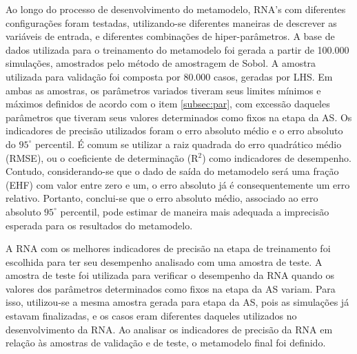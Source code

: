\documentclass[brazil,hardcopy,openany,a5paper]{ufscthesis}
\begin{document}
		Ao longo do processo de desenvolvimento do metamodelo, RNA's com diferentes configurações foram testadas, utilizando-se diferentes maneiras de descrever as variáveis de entrada, e diferentes combinações de hiper-parâmetros.
		A base de dados utilizada para o treinamento do metamodelo foi gerada a partir de 100.000 simulações, amostrados pelo método de amostragem de Sobol.
		A amostra utilizada para validação foi composta por 80.000 casos, geradas por LHS.
		Em ambas as amostras, os parâmetros variados tiveram seus limites mínimos e máximos definidos de acordo com o item \ref{subsec:par}, com excessão daqueles parâmetros que tiveram seus valores determinados como fixos na etapa da AS.
		Os indicadores de precisão utilizados foram o erro absoluto médio e o erro absoluto do $95^{\circ}$ percentil.
		É comum se utilizar a raiz quadrada do erro quadrático médio (RMSE), ou o coeficiente de determinação (R$^2$) como indicadores de desempenho. Contudo, considerando-se que o dado de saída do metamodelo será uma fração (EHF) com valor entre zero e um, o erro absoluto já é consequentemente um erro relativo. Portanto, conclui-se que o erro absoluto médio, associado ao erro absoluto $95^{\circ}$ percentil, pode estimar de maneira mais adequada a imprecisão esperada para os resultados do metamodelo.
		
		A RNA com os melhores indicadores de precisão na etapa de treinamento foi escolhida para ter seu desempenho analisado com uma amostra de teste. 
		A amostra de teste foi utilizada para verificar o desempenho da RNA quando os valores dos parâmetros determinados como fixos na etapa da AS variam. Para isso, utilizou-se a mesma amostra gerada para etapa da AS, pois as simulações já estavam finalizadas, e os casos eram diferentes daqueles utilizados no desenvolvimento da RNA.
		Ao analisar os indicadores de precisão da RNA em relação às amostras de validação e de teste, o metamodelo final foi definido.
		

%
%

	
\end{document}
